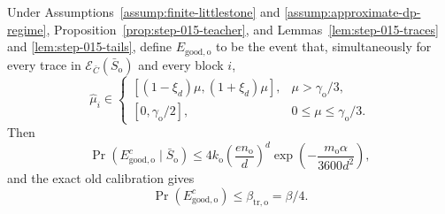 \begin{proposition}\label{prop:step-015-good}
Under Assumptions~\ref{assump:finite-littlestone} and
\ref{assump:approximate-dp-regime},
Proposition~\ref{prop:step-015-teacher}, and
Lemmas~\ref{lem:step-015-traces} and \ref{lem:step-015-tails}, define
\(E_{\mathrm{good,o}}\) to be the event that, simultaneously for every
trace in \(\mathcal E_{\bar C}(\bar S_{\mathrm o})\) and every block \(i\),
\[
\widehat\mu_i\in
\begin{cases}
[(1-\xi_d)\mu,(1+\xi_d)\mu],
&\mu>\gamma_{\mathrm o}/3,\\
[0,\gamma_{\mathrm o}/2],
&0\le\mu\le\gamma_{\mathrm o}/3.
\end{cases}
\tag{9.1}
\]
Then
\[
\Pr(E_{\mathrm{good,o}}^c\mid\bar S_{\mathrm o})
\le4k_{\mathrm o}
\left(\frac{en_{\mathrm o}}d\right)^d
\exp\!\left(-\frac{m_{\mathrm o}\alpha}{3600d^2}\right),
\tag{9.2}
\]
and the exact old calibration gives
\[
\Pr(E_{\mathrm{good,o}}^c)\le\beta_{\mathrm{tr,o}}=\beta/4.
\tag{9.3}
\]


\end{proposition}

